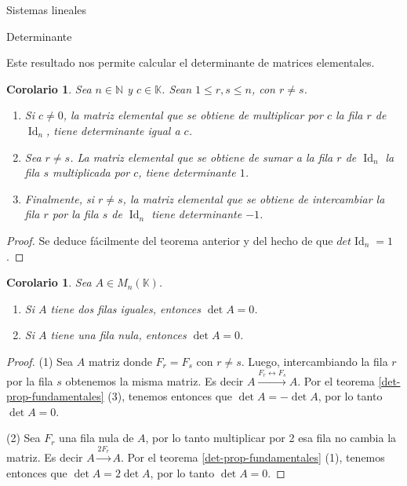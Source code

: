 \documentclass[a4paper,12pt,twoside,spanish,reqno]{amsbook}
\newtheorem{corolario}[teorema]{Corolario}
\theoremstyle{definition}
\theoremstyle{remark}
\newcommand{\Id}{\operatorname{Id}}
\newcommand{\K}{\mathbb K}
\begin{document}
\begin{chapter}{Sistemas lineales}
\begin{section}{Determinante}
	
	
	Este resultado nos permite calcular el determinante de matrices elementales.
	
	
	
	
	\begin{corolario}\label{det-mtrx-elem} Sea $n \in \mathbb N$ y $c \in \K$. Sean $1 \le r,s \le n$,  con $r \ne s$.
		\begin{enumerate}
			\item Si $c \not=0$, la matriz elemental que se obtiene de multiplicar por  $c$ la fila $r$ de $\Id_n$, tiene determinante igual a $c$.
			\item Sea $r \ne s$. La matriz elemental que se obtiene de sumar a la fila $r$ de $\Id_n$  la fila $s$ multiplicada por $c$, tiene determinante $1$.
			\item Finalmente, si $r \ne s$, la matriz elemental que se obtiene de intercambiar la fila $r$ por la fila $s$ de $\Id_n$ tiene determinante $-1$.
		\end{enumerate}	
	\end{corolario} 
	\begin{proof}
		Se deduce fácilmente del teorema anterior y del hecho de que $det \Id_n =1$.			
	\end{proof}
	
	
	\begin{corolario}\label{det-filas-iguales} Sea $A  \in M_n(\K)$.
		\begin{enumerate}
			\item Si $A$ tiene dos filas iguales,  entonces $\det A=0$.
			\item Si $A$ tiene una fila nula, entonces $\det A =0$.
		\end{enumerate}
	\end{corolario}
	\begin{proof}
		(1) Sea $A$ matriz donde $F_r = F_s$ con $r\ne s$. Luego, intercambiando la fila $r$ por la fila $s$ obtenemos la misma matriz. Es decir $A  \stackrel{F_r \leftrightarrow F_s}{\longrightarrow} A$. Por el teorema \ref{det-prop-fundamentales} (3), tenemos entonces que $\det A = - \det A$, por lo tanto  $\det A =0$. 
		
		(2) Sea $F_r$ una fila nula de $A$, por lo tanto multiplicar por 2 esa fila no cambia la matriz. Es decir $A  \stackrel{2F_r}{\longrightarrow} A$. Por el teorema \ref{det-prop-fundamentales} (1), tenemos entonces que $\det A = 2\det A$, por lo tanto  $\det A =0$.
	\end{proof}
	
	
	

\end{section}
\end{chapter}
\end{document}

